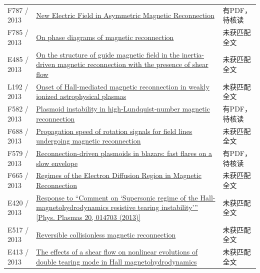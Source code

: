 \begin{longtable}{P{24mm}P{97mm}P{27mm}}
F787 / 2013 & \href{https://doi.org/10.1103/physrevlett.111.135001}{New Electric Field in Asymmetric Magnetic Reconnection} & 有PDF，待核读\\

F785 / 2013 & \href{https://doi.org/10.1063/1.4811120}{On phase diagrams of magnetic reconnection} & 未获匹配全文\\

E485 / 2013 & \href{https://doi.org/10.1063/1.4829039}{On the structure of guide magnetic field in the inertia-driven magnetic reconnection with the presence of shear flow} & 未获匹配全文\\

L192 / 2013 & \href{https://doi.org/10.1093/mnras/stt1155}{Onset of Hall-mediated magnetic reconnection in weakly ionized astrophysical plasmas} & 未获匹配全文\\

F582 / 2013 & \href{https://doi.org/10.1063/1.4802941}{Plasmoid instability in high-Lundquist-number magnetic reconnection} & 有PDF，待核读\\

F688 / 2013 & \href{https://doi.org/10.1063/1.4825132}{Propagation speed of rotation signals for field lines undergoing magnetic reconnection} & 未获匹配全文\\

F579 / 2013 & \href{https://doi.org/10.1093/mnras/stt167}{Reconnection-driven plasmoids in blazars: fast flares on a slow envelope} & 有PDF，待核读\\

F665 / 2013 & \href{https://doi.org/10.1103/physrevlett.110.135004}{Regimes of the Electron Diffusion Region in Magnetic Reconnection} & 未获匹配全文\\

E420 / 2013 & \href{https://doi.org/10.1063/1.4789450}{Response to “Comment on ‘Supersonic regime of the Hall-magnetohydrodynamics resistive tearing instability’” [Phys. Plasmas 20,  014703 (2013)]} & 未获匹配全文\\

E517 / 2013 & \href{https://doi.org/10.1063/1.4826201}{Reversible collisionless magnetic reconnection} & 未获匹配全文\\

E413 / 2013 & \href{https://doi.org/10.1016/j.physleta.2013.07.014}{The effects of a shear flow on nonlinear evolutions of double tearing mode in Hall magnetohydrodynamics} & 未获匹配全文\\


\end{longtable}
